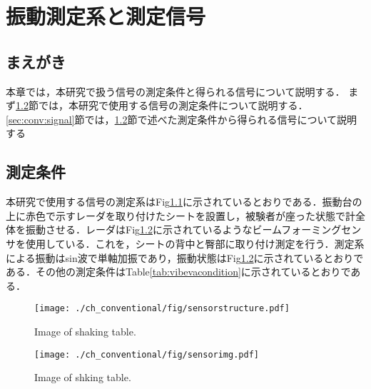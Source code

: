 \chapter{振動測定系と測定信号}
\label{chap:conv}

\section{まえがき}
本章では，本研究で扱う信号の測定条件と得られる信号について説明する．
まず\ref{sec:conv:measurementcondition}節では，本研究で使用する信号の測定条件について説明する．
\ref{sec:conv:signal}節では，\ref{sec:conv:measurementcondition}節で述べた測定条件から得られる信号について説明する

\section{測定条件}
\label{sec:conv:measurementcondition}
本研究で使用する信号の測定系はFig\ref{fig:sensorstructure}に示されているとおりである．振動台の上に赤色で示すレーダを取り付けたシートを設置し，被験者が座った状態で計全体を振動させる．レーダはFig\ref{fig:sensorimg}に示されているようなビームフォーミングセンサを使用している．これを，シートの背中と臀部に取り付け測定を行う．測定系による振動はsin波で単軸加振であり，振動状態はFig\ref{fig:sensorimg}に示されているとおりである．その他の測定条件はTable\ref{tab:vibevacondition}に示されているとおりである．

\begin{figure}[tb]
\centering
\texttt{[image: ./ch\_conventional/fig/sensorstructure.pdf]}
\caption{Image of shaking table.}
\label{fig:sensorstructure}
\end{figure}

\begin{figure}[tb]
\centering
\texttt{[image: ./ch\_conventional/fig/sensorimg.pdf]}
\caption{Image of shking table.}
\label{fig:sensorimg}
\end{figure}

